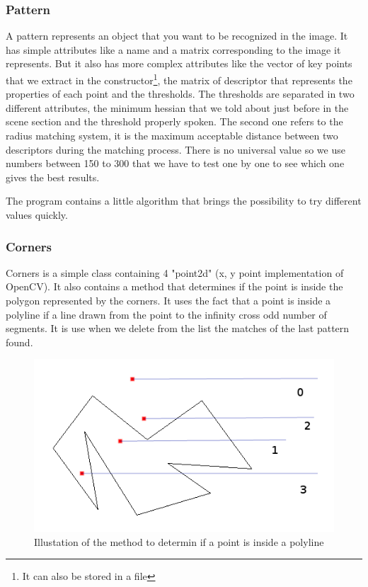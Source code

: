 \documentclass[english,a4paper,11pt]{report}
\begin{document}
	\subsubsection{Pattern}
	\par A pattern represents an object that you want to be recognized in the image. It has simple attributes like a name and a matrix corresponding to the image it represents. But it also has more complex attributes like the vector of key points that we extract in the constructor\footnote{It can also be stored in a file}, the matrix of descriptor that represents the properties of each point and the thresholds. The thresholds are separated in two different attributes, the minimum hessian that we told about just before in the scene section and the threshold properly spoken. The second one refers to the radius matching system, it is the maximum acceptable distance between two descriptors during the matching process. There is no universal value so we use numbers between 150 to 300 that we have to test one by one to see which one gives the best results.
 \par The program contains a little algorithm that brings the possibility to try different values quickly.
	
	
	\subsubsection{Corners}
	\par Corners is a simple class containing 4 "point2d" (x, y point implementation of OpenCV).
It also contains a method that determines if the point is inside the polygon represented by the corners. It uses the fact that a point is inside a polyline if a line drawn from the point to the infinity cross odd number of segments. It is use when we delete from the list the matches of the last pattern found.
	\begin{figure}[h]
		\begin{center}
			\includegraphics[scale=0.7]{images_not_compressed/isIn.png}
			\caption{Illustation of the method to determin if a point is inside a polyline}
		\end{center}
	\end{figure}
\end{document}
